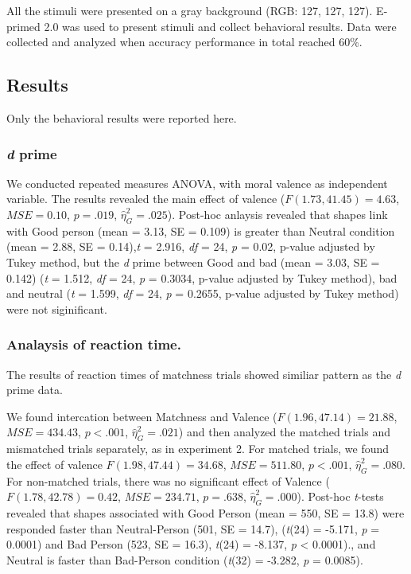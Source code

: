 \documentclass[man]{apa6}
\begin{document}
All the stimuli were presented on a gray background (RGB: 127, 127, 127). E-primed 2.0 was used to present stimuli and collect behavioral results. Data were collected and analyzed when accuracy performance in total reached 60\%.

\hypertarget{results-8}{%
\subsection{Results}\label{results-8}}

Only the behavioral results were reported here.

\hypertarget{d-prime-1}{%
\subsubsection{\texorpdfstring{\emph{d} prime}{d prime}}\label{d-prime-1}}

We conducted repeated measures ANOVA, with moral valence as independent variable. The results revealed the main effect of valence (\(F(1.73, 41.45) = 4.63\), \(\mathit{MSE} = 0.10\), \(p = .019\), \(\hat{\eta}^2_G = .025\)). Post-hoc anlaysis revealed that shapes link with Good person (mean = 3.13, SE = 0.109) is greater than Neutral condition (mean = 2.88, SE = 0.14),\emph{t} = 2.916, \emph{df} = 24, \emph{p} = 0.02, p-value adjusted by Tukey method, but the \emph{d} prime between Good and bad (mean = 3.03, SE = 0.142) (\emph{t} = 1.512, \emph{df} = 24, \emph{p} = 0.3034, p-value adjusted by Tukey method), bad and neutral (\emph{t} = 1.599, \emph{df} = 24, \emph{p} = 0.2655, p-value adjusted by Tukey method) were not siginificant.

\hypertarget{analaysis-of-reaction-time.-5}{%
\subsubsection{Analaysis of reaction time.}\label{analaysis-of-reaction-time.-5}}

The results of reaction times of matchness trials showed similiar pattern as the \emph{d} prime data.

We found intercation between Matchness and Valence (\(F(1.96, 47.14) = 21.88\), \(\mathit{MSE} = 434.43\), \(p < .001\), \(\hat{\eta}^2_G = .021\)) and then analyzed the matched trials and mismatched trials separately, as in experiment 2. For matched trials, we found the effect of valence \(F(1.98, 47.44) = 34.68\), \(\mathit{MSE} = 511.80\), \(p < .001\), \(\hat{\eta}^2_G = .080\). For non-matched trials, there was no significant effect of Valence (\(F(1.78, 42.78) = 0.42\), \(\mathit{MSE} = 234.71\), \(p = .638\), \(\hat{\eta}^2_G = .000\)). Post-hoc \emph{t}-tests revealed that shapes associated with Good Person (mean = 550, SE = 13.8) were responded faster than Neutral-Person (501, SE = 14.7), (\emph{t}(24) = -5.171, \emph{p} = 0.0001) and Bad Person (523, SE = 16.3), \emph{t}(24) = -8.137, \emph{p} \textless{} 0.0001)., and Neutral is faster than Bad-Person condition (\emph{t}(32) = -3.282, \emph{p} = 0.0085).
\end{document}

